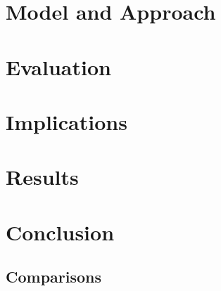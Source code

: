 \documentclass[twoside,twocolumn]{article}
\begin{document}

\section{Model and Approach}

\section{Evaluation}

\section{Implications}

\section{Results}



\section{Conclusion}


\subsection{Comparisons}






\printbibliography

  

\end{document}
